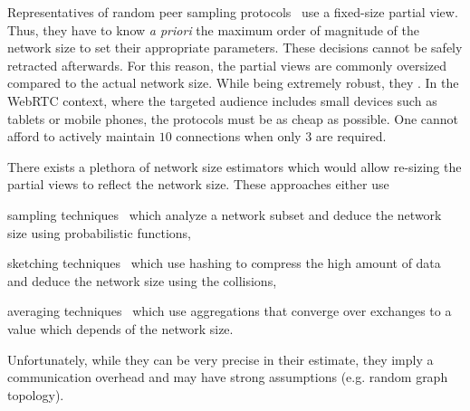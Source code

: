 Representatives of random peer sampling protocols~\cite{voulgaris2005cyclon,
  eugster2003lightweight, tolgyeski2009adaptive} use a fixed-size partial view.
Thus, they have to know \emph{a priori} the maximum order of magnitude of the
network size to set their appropriate parameters. These decisions cannot be
safely retracted afterwards. For this reason, the partial views are commonly
oversized compared to the actual network size. While being extremely robust,
they . In the WebRTC context, where the targeted
audience includes small devices such as tablets or mobile phones, the protocols
must be as cheap as possible. One cannot afford to actively maintain $10$
connections when only $3$ are required.

There exists a plethora of network size estimators which would allow re-sizing
the partial views to reflect the network size. These approaches either use
\begin{inparaenum}[(i)]
\item sampling techniques~\cite{mane05network, ganesh2007peer,
    kostoulas2007active} which analyze a network subset and deduce the network
  size using probabilistic functions,
\item sketching techniques~\cite{flajolet2008hyperloglog, baquero2012extrema}
  which use hashing to compress the high amount of data and deduce the network
  size using the collisions,
\item averaging techniques~\cite{jelasity2004epidemic, blasa2011symmetric}
  which use aggregations that converge over exchanges to a value which depends
  of the network size.
\end{inparaenum}
Unfortunately, while they can be very precise in their estimate, they imply a
communication overhead and may have strong assumptions (e.g. random graph
topology).


